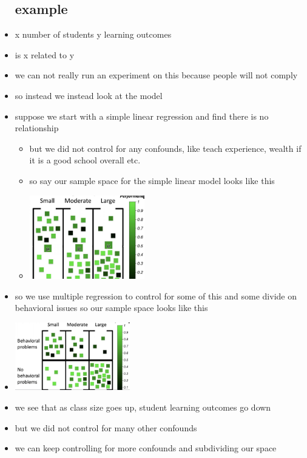 \documentclass{article}
\begin{document}
\begin{itemize}
\subsection{example}
\item x number of students y learning outcomes 
\item is x related to y
\item we can not really run an experiment on this because people will not comply 
\item so instead we instead look at the model 
\item suppose we start with a simple linear regression and find there is no relationship
\begin{itemize}
\item but we did not control for any confounds, like teach experience, wealth if it is a good school overall etc. 
\item so say our sample space for the simple linear model looks like this 
\item \includegraphics[width=5cm]{Final_Review/lecture_9/sample_space_1.jpg}
\end{itemize}
\item so we use multiple regression to control for some of this and some divide on behavioral issues so our sample space looks like this\item  \includegraphics[width=5cm]{Final_Review/lecture_9/sample_space_2.jpg}
\item we see that as class size goes up, student learning outcomes go down 
\item but we did not control for many other confounds 
\item we can keep controlling for more confounds and subdividing our space

\end{itemize}
\end{document}
